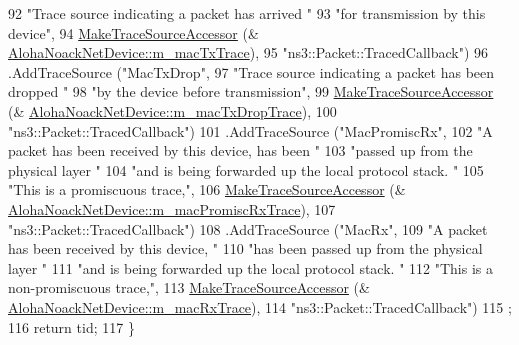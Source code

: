 \begin{DoxyCode}
92                      \textcolor{stringliteral}{"Trace source indicating a packet has arrived "}
93                      \textcolor{stringliteral}{"for transmission by this device"},
94                      \hyperlink{group__tracing_gab21a770b9855af4e8f69f7531ea4a6b0}{MakeTraceSourceAccessor} (&
      \hyperlink{classns3_1_1AlohaNoackNetDevice_ac8a6a956dfec61c30027e584963fa22a}{AlohaNoackNetDevice::m\_macTxTrace}),
95                      \textcolor{stringliteral}{"ns3::Packet::TracedCallback"})
96     .AddTraceSource (\textcolor{stringliteral}{"MacTxDrop"},
97                      \textcolor{stringliteral}{"Trace source indicating a packet has been dropped "}
98                      \textcolor{stringliteral}{"by the device before transmission"},
99                      \hyperlink{group__tracing_gab21a770b9855af4e8f69f7531ea4a6b0}{MakeTraceSourceAccessor} (&
      \hyperlink{classns3_1_1AlohaNoackNetDevice_adc3f9270d17a4e2e56cd620a6419fbfb}{AlohaNoackNetDevice::m\_macTxDropTrace}),
100                      \textcolor{stringliteral}{"ns3::Packet::TracedCallback"})
101     .AddTraceSource (\textcolor{stringliteral}{"MacPromiscRx"},
102                      \textcolor{stringliteral}{"A packet has been received by this device, has been "}
103                      \textcolor{stringliteral}{"passed up from the physical layer "}
104                      \textcolor{stringliteral}{"and is being forwarded up the local protocol stack.  "}
105                      \textcolor{stringliteral}{"This is a promiscuous trace,"},
106                      \hyperlink{group__tracing_gab21a770b9855af4e8f69f7531ea4a6b0}{MakeTraceSourceAccessor} (&
      \hyperlink{classns3_1_1AlohaNoackNetDevice_a55830dfed6857f94fbbb3ca2346c2537}{AlohaNoackNetDevice::m\_macPromiscRxTrace}),
107                      \textcolor{stringliteral}{"ns3::Packet::TracedCallback"})
108     .AddTraceSource (\textcolor{stringliteral}{"MacRx"},
109                      \textcolor{stringliteral}{"A packet has been received by this device, "}
110                      \textcolor{stringliteral}{"has been passed up from the physical layer "}
111                      \textcolor{stringliteral}{"and is being forwarded up the local protocol stack.  "}
112                      \textcolor{stringliteral}{"This is a non-promiscuous trace,"},
113                      \hyperlink{group__tracing_gab21a770b9855af4e8f69f7531ea4a6b0}{MakeTraceSourceAccessor} (&
      \hyperlink{classns3_1_1AlohaNoackNetDevice_a04f0f23d5d37f2e550c9ecdecaab29dd}{AlohaNoackNetDevice::m\_macRxTrace}),
114                      \textcolor{stringliteral}{"ns3::Packet::TracedCallback"})
115   ;
116   \textcolor{keywordflow}{return} tid;
117 \}
\end{DoxyCode}


